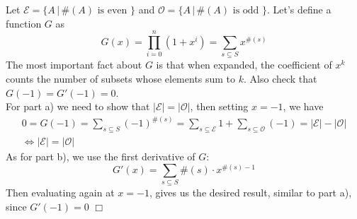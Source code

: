\begin{solution}
    Let $\mathcal{E} = \{ A \, | \, \#(A) \text{ is even } \}$ and $\mathcal{O} = \{ A \, | \, \#(A) \text{ is odd } \}$. Let's define a function $G$ as
    $$ G(x) = \prod_{i=0}^n (1 + x^i) = \sum_{s \subseteq S} x^{\#(s)}$$
    The most important fact about $G$ is that when expanded, the coefficient of $x^k$ counts the number of subsets whose elements sum to $k$. Also check that $G(-1) = G'(-1) =  0$. \\
    For part a) we need to show that $|\mathcal{E}| = |\mathcal{O}|$, then setting $x=-1$, we have 
    \begin{align*}
        0 = G(-1) = \sum_{s \subseteq S} (-1)^{\#(s)} = \sum_{s \subseteq \mathcal{E}} 1 + \sum_{s \subseteq \mathcal{O}} (-1) = |\mathcal{E}| - |\mathcal{O}| \\
        \iff |\mathcal{E}| = |\mathcal{O}| 
    \end{align*}
    As for part b), we use the first derivative of $G$: 
    $$ G'(x) = \sum_{s \subseteq S} \#(s) \cdot x^{\#(s) - 1}$$
    Then evaluating again at $x=-1$, gives us the desired result, similar to part a), since $G'(-1) = 0$ $\Box$
\end{solution}

